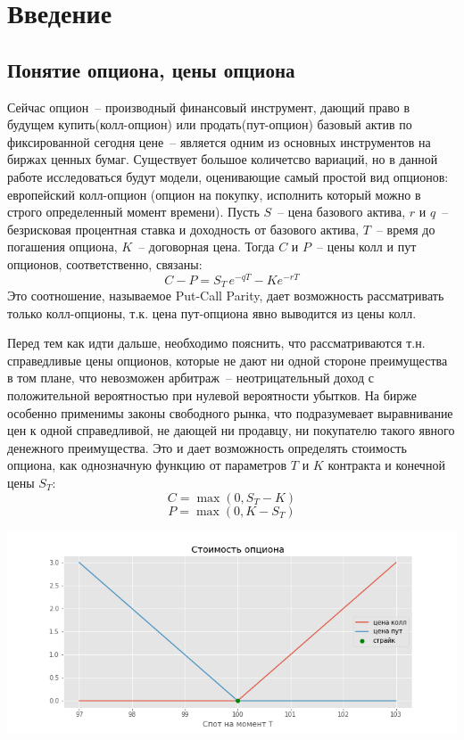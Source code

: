 \documentclass[oneside, final, 12pt]{article}
\begin{document}
\newpage
\section{Введение}
\subsection{Понятие опциона, цены опциона}
Сейчас опцион~-- производный финансовый инструмент, дающий право в будущем купить(колл-опцион) или продать(пут-опцион) базовый актив по фиксированной сегодня цене~-- является одним из основных инструментов на биржах ценных бумаг. Существует большое количетсво вариаций, но в данной работе исследоваться будут модели, оценивающие самый простой вид опционов: европейский колл-опцион (опцион на покупку, исполнить который можно в строго определенный момент времени). Пусть $S$~-- цена базового актива, $r$ и $q$~-- безрисковая процентная ставка и доходность от базового актива, $T$~-- время до погашения опциона, $K$~-- договорная цена. Тогда $C$ и $P$~-- цены колл и пут опционов, соответственно, связаны: 
\begin{equation}\label{put_call_parity}
C-P = S_T\,e^{-qT} - Ke^{-rT}
\end{equation}
Это соотношение, называемое Put-Call Parity, дает возможность рассматривать только колл-опционы, т.к. цена пут-опциона явно выводится из цены колл. \par
Перед тем как идти дальше, необходимо пояснить, что рассматриваются т.н. справедливые цены опционов, которые не дают ни одной стороне преимущества в том плане, что невозможен арбитраж~-- неотрицательный доход с положительной вероятностью при нулевой вероятности убытков. На бирже особенно применимы законы свободного рынка, что подразумевает выравнивание цен к одной справедливой, не дающей ни продавцу, ни покупателю такого явного денежного преимущества. Это и дает возможность определять стоимость опциона, как однозначную функцию от параметров $T$ и $K$ контракта и конечной цены $S_T$:
\begin{equation}\label{call_price}
C = \max(0, S_T - K)
\end{equation}
\begin{equation}\label{put_price}
P = \max(0, K - S_T)
\end{equation}
\begin{center}
  \includegraphics[width=1\linewidth]{img/call-put_price.png}
\end{center}
\end{document}
